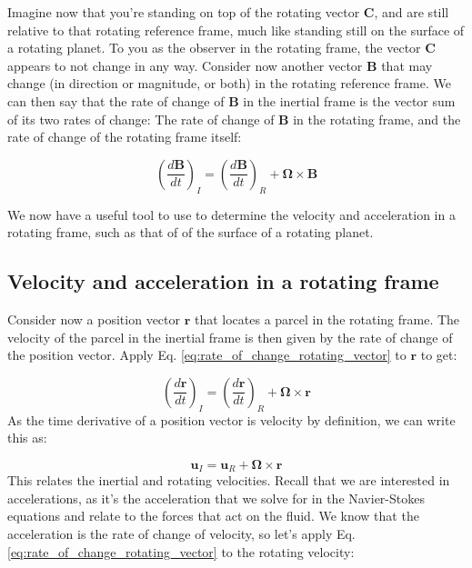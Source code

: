 \documentclass[12pt]{article}
\numberwithin{equation}{section}
\numberwithin{figure}{section}
\numberwithin{table}{section}
\begin{document}
Imagine now that you're standing on top of the rotating vector $\mathbf{C}$,
and are still relative to that rotating reference frame, much like standing
still on the surface of a rotating planet.
To you as the observer in the rotating frame, the vector $\mathbf{C}$ appears
to not change in any way.
Consider now another vector $\mathbf{B}$ that may change (in direction or
magnitude, or both) in the rotating reference frame.
We can then say that the rate of change of $\mathbf{B}$ in the inertial frame
is the vector sum of its two rates of change:
The rate of change of $\mathbf{B}$ in the rotating frame, and the rate of
change of the rotating frame itself:

\begin{equation}
  \left(\frac{d\mathbf{B}}{dt}\right)_I = \left(\frac{d\mathbf{B}}{dt}\right)_R + \mathbf{\Omega} \times \mathbf{B}
  \label{eq:rate_of_change_rotating_vector}
\end{equation}

We now have a useful tool to use to determine the velocity and acceleration in
a rotating frame, such as that of of the surface of a rotating planet.

\subsection{Velocity and acceleration in a rotating frame}

Consider now a position vector $\mathbf{r}$ that locates a parcel in the rotating
frame.
The velocity of the parcel in the inertial frame is then given by the rate of
change of the position vector.
Apply Eq. \ref{eq:rate_of_change_rotating_vector} to $\mathbf{r}$ to get:

\begin{equation}
  \left( \frac{d\mathbf{r}}{dt} \right)_I = \left( \frac{d\mathbf{r}}{dt} \right)_R + \mathbf{\Omega} \times \mathbf{r}
\end{equation}
As the time derivative of a position vector is velocity by definition, we can
write this as:

\begin{equation}
  \mathbf{u}_I = \mathbf{u}_R + \mathbf{\Omega} \times \mathbf{r}
  \label{eq:inertial_velocity}
\end{equation}
This relates the inertial and rotating velocities.
Recall that we are interested in accelerations, as it's the acceleration that
we solve for in the Navier-Stokes equations and relate to the forces that act
on the fluid.
We know that the acceleration is the rate of change of velocity, so let's apply
Eq. \ref{eq:rate_of_change_rotating_vector} to the rotating velocity:
\end{document}
